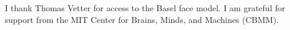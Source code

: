 I thank Thomas Vetter for access to the Basel face model. I am grateful
for support from the MIT Center for Brains, Minds, and Machines (CBMM).

